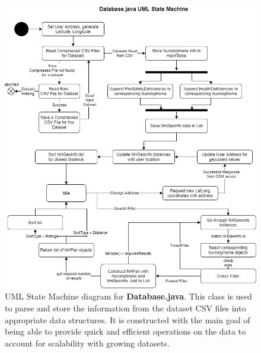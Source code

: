 \documentclass[12pt]{article}
\begin{document}
\begin{center}
\begin{figure}
\includegraphics[width=16cm]{Pictures/Database StateMachine.png}
\caption{UML State Machine diagram for \textbf{Database.java}. This class is used to parse and store the information from the dataset CSV files into appropriate data structures. It is constructed with the main goal of being able to provide quick and efficient operations on the data to account for scalability with growing datasets.}
\label{fig:DatabaseStateUML}
\end{figure}
\end{center}

\newpage
\end{document}
